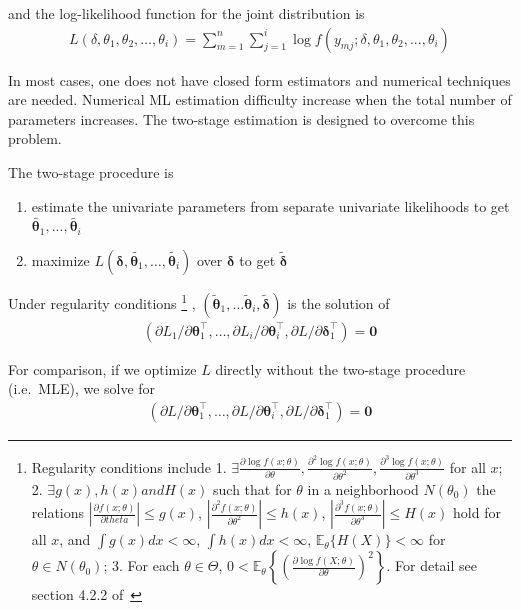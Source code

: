 and the log-likelihood function for the joint distribution is
\begin{align}
    L(\delta, \theta_1, \theta_2, \dots, \theta_i) = \sum^n_{m=1}\sum^i_{j=1} \log f(y_{mj}; \delta, \theta_1, \theta_2, ..., \theta_i)
    \end{align}

In most cases, one does not have closed form estimators and numerical techniques are needed.
Numerical ML estimation difficulty increase when the total number of parameters increases.
The two-stage estimation is designed to overcome this problem.

The two-stage procedure is
\begin{enumerate}
    \item estimate the univariate parameters from separate univariate likelihoods to get $\tilde{\pmb{\theta}_1}, ..., \tilde{\pmb{\theta}_i}$
    \item maximize $L(\pmb{\delta}, \tilde{\pmb{\theta}_1}, \dots, \tilde{\pmb{\theta}_i})$ over $\pmb{\delta}$ to get $\tilde{\pmb{\delta}}$
    \end{enumerate}

Under regularity conditions
\footnote{Regularity conditions include
1. $\exists \frac{\partial \log f(x;\theta)}{\partial \theta}, \frac{\partial^2 \log f(x;\theta)}{\partial \theta^2}, \frac{\partial^3 \log f(x;\theta)}{\partial \theta^3}$ for all $x$;
2. $\exists g(x), h(x) and H(x)$ such that for $\theta$ in a neighborhood $N(\theta_0)$ the relations
$\left|\frac{\partial f(x;\theta)}{\partial theta}\right| \leq g(x)$,
$\left|\frac{\partial^2 f(x;\theta)}{\partial \theta^2}\right| \leq h(x)$,
$\left|\frac{\partial^3 f(x;\theta)}{\partial \theta^3}\right| \leq H(x)$ hold for all $x$, and
$\int g(x) dx < \infty$, $\int h(x) dx < \infty$, $\mathbb{E}_\theta \{H(X)\} < \infty$ for $\theta \in N(\theta_0)$;
3. For each $\theta \in \Theta$, $0< \mathbb{E}_\theta \left\{
\left(
\frac{\partial \log f(X;\theta)}{\partial \theta}
\right)^2
\right\}$. For detail see section 4.2.2 of~\cite{serfling2009approximation}}
, $(\pmb{\tilde{\theta}}_1,\dots \pmb{\tilde{\theta}}_i, \pmb{\tilde{\delta}})$ is the solution of
\begin{align}
    (\partial L_1 / \partial \pmb{\theta}^\intercal_1,
    \dots, \partial L_i / \partial \pmb{\theta}^\intercal_i, \partial L / \partial \pmb{\pmb{\delta}}^\intercal_1) = \pmb{0}
    \end{align}

For comparison, if we optimize $L$ directly without the two-stage procedure (i.e.~MLE), we solve for
\begin{align}
    (\partial L / \partial \pmb{\theta}^\intercal_1,
    \dots, \partial L / \partial \pmb{\theta}^\intercal_i, \partial L / \partial \pmb{\pmb{\delta}}^\intercal_1) = \pmb{0}
    \end{align}


